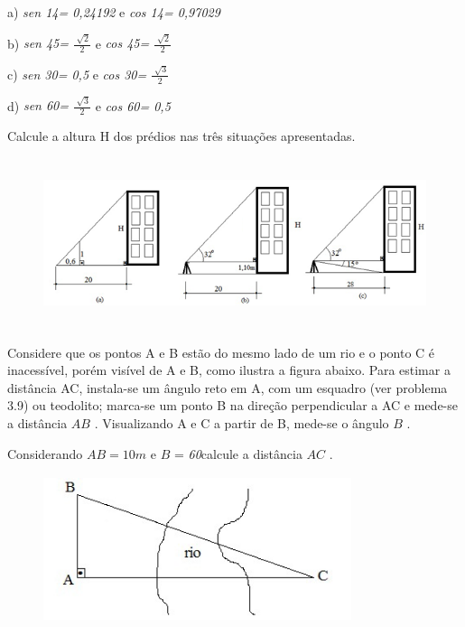 \begin{exercicios}
a) \textit{sen 14\degree = 0,24192 }e \textit{cos 14\degree = 0,97029}

b) \textit{sen 45\degree =  \( \frac{\sqrt[]{2}}{2} \)  }e \textit{cos 45\degree =  \( \frac{\sqrt[]{2}}{2} \)}

c) \textit{sen 30\degree = 0,5 }e \textit{cos 30\degree =  \( \frac{\sqrt[]{3}}{2} \) }   

d)\textit{ sen 60\degree =  \( \frac{\sqrt[]{3}}{2} \)  }e \textit{cos 60\degree = 0,5}

\exitem{} Calcule a altura H dos prédios nas três situações apresentadas.

\begin{figure}[H]
    \begin{Center}
        \includegraphics[width=5.9in,height=1.95in]{capitulos/trigonometria_e_funcoes_trigonometricas/media/image24.png}
    \end{Center}
\end{figure}

\exitem{} Considere que os pontos A e B estão do mesmo lado de um rio e o ponto C é inacessível, porém visível de A e B, como ilustra a figura abaixo. Para estimar a distância AC, instala-se um ângulo reto em A, com um esquadro (ver problema 3.9) ou teodolito; marca-se um ponto B na direção perpendicular a AC e mede-se a distância  \( AB \) . Visualizando A e C a partir de B, mede-se o ângulo  \( B \) .

Considerando   \( AB=10m \)  e      \( B \) = \textit{60\degree }calcule a distância   \( AC \) .

\begin{figure}[H]
    \begin{Center}
        \includegraphics[width=3.55in,height=1.7in]{capitulos/trigonometria_e_funcoes_trigonometricas/media/image25.png}
    \end{Center}
\end{figure}
\end{exercicios}

